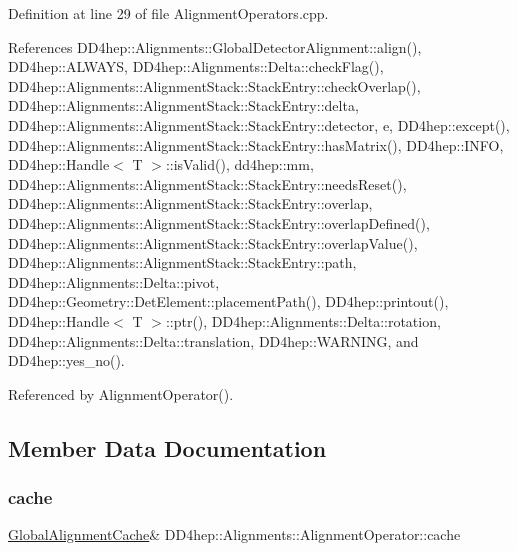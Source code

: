 Definition at line 29 of file Alignment\+Operators.\+cpp.



References D\+D4hep\+::\+Alignments\+::\+Global\+Detector\+Alignment\+::align(), D\+D4hep\+::\+A\+L\+W\+A\+YS, D\+D4hep\+::\+Alignments\+::\+Delta\+::check\+Flag(), D\+D4hep\+::\+Alignments\+::\+Alignment\+Stack\+::\+Stack\+Entry\+::check\+Overlap(), D\+D4hep\+::\+Alignments\+::\+Alignment\+Stack\+::\+Stack\+Entry\+::delta, D\+D4hep\+::\+Alignments\+::\+Alignment\+Stack\+::\+Stack\+Entry\+::detector, e, D\+D4hep\+::except(), D\+D4hep\+::\+Alignments\+::\+Alignment\+Stack\+::\+Stack\+Entry\+::has\+Matrix(), D\+D4hep\+::\+I\+N\+FO, D\+D4hep\+::\+Handle$<$ T $>$\+::is\+Valid(), dd4hep\+::mm, D\+D4hep\+::\+Alignments\+::\+Alignment\+Stack\+::\+Stack\+Entry\+::needs\+Reset(), D\+D4hep\+::\+Alignments\+::\+Alignment\+Stack\+::\+Stack\+Entry\+::overlap, D\+D4hep\+::\+Alignments\+::\+Alignment\+Stack\+::\+Stack\+Entry\+::overlap\+Defined(), D\+D4hep\+::\+Alignments\+::\+Alignment\+Stack\+::\+Stack\+Entry\+::overlap\+Value(), D\+D4hep\+::\+Alignments\+::\+Alignment\+Stack\+::\+Stack\+Entry\+::path, D\+D4hep\+::\+Alignments\+::\+Delta\+::pivot, D\+D4hep\+::\+Geometry\+::\+Det\+Element\+::placement\+Path(), D\+D4hep\+::printout(), D\+D4hep\+::\+Handle$<$ T $>$\+::ptr(), D\+D4hep\+::\+Alignments\+::\+Delta\+::rotation, D\+D4hep\+::\+Alignments\+::\+Delta\+::translation, D\+D4hep\+::\+W\+A\+R\+N\+I\+NG, and D\+D4hep\+::yes\+\_\+no().



Referenced by Alignment\+Operator().



\subsection{Member Data Documentation}
\hypertarget{class_d_d4hep_1_1_alignments_1_1_alignment_operator_a931deb1a003ec4c619fae0b0d728f8d2}{}\label{class_d_d4hep_1_1_alignments_1_1_alignment_operator_a931deb1a003ec4c619fae0b0d728f8d2} 
\subsubsection{\texorpdfstring{cache}{cache}}
{\footnotesize\ttfamily \hyperlink{class_d_d4hep_1_1_alignments_1_1_global_alignment_cache}{Global\+Alignment\+Cache}\& D\+D4hep\+::\+Alignments\+::\+Alignment\+Operator\+::cache}




